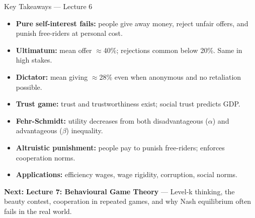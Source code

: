\documentclass[aspectratio=169]{beamer}
\begin{document}
\begin{frame}{Key Takeaways --- Lecture 6}
\begin{itemize}
  \item[\textcolor{beteal}{\checkmark}] \textbf{Pure self-interest fails:} people give away money, reject unfair offers, and punish free-riders at personal cost.
  \item[\textcolor{beteal}{\checkmark}] \textbf{Ultimatum:} mean offer $\approx$40\%; rejections common below 20\%. Same in high stakes.
  \item[\textcolor{beteal}{\checkmark}] \textbf{Dictator:} mean giving $\approx$28\% even when anonymous and no retaliation possible.
  \item[\textcolor{beteal}{\checkmark}] \textbf{Trust game:} trust and trustworthiness exist; social trust predicts GDP.
  \item[\textcolor{beteal}{\checkmark}] \textbf{Fehr-Schmidt:} utility decreases from both disadvantageous ($\alpha$) and advantageous ($\beta$) inequality.
  \item[\textcolor{beteal}{\checkmark}] \textbf{Altruistic punishment:} people pay to punish free-riders; enforces cooperation norms.
  \item[\textcolor{beteal}{\checkmark}] \textbf{Applications:} efficiency wages, wage rigidity, corruption, social norms.
\end{itemize}
\medskip\textcolor{beblue}{\textbf{Next:}} \textbf{Lecture 7: Behavioural Game Theory} --- Level-k thinking, the beauty contest, cooperation in repeated games, and why Nash equilibrium often fails in the real world.
\end{frame}
\end{document}
